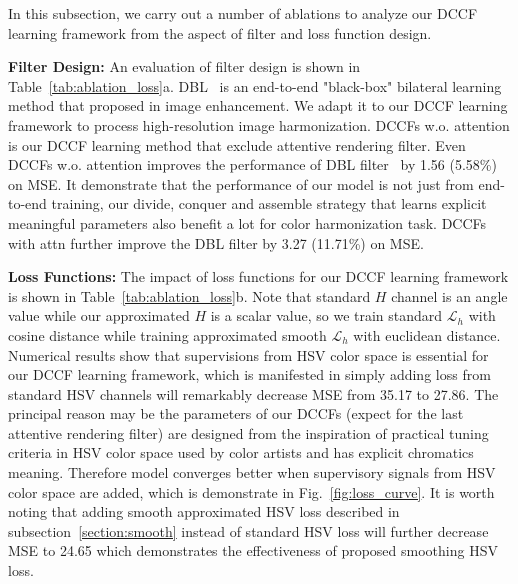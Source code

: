 \documentclass[runningheads]{llncs}
\begin{document}
    In this subsection, we carry out a number of ablations to analyze our DCCF learning framework from the aspect of filter and loss function design.
    
    \textbf{Filter Design:} An evaluation of filter design is shown in Table~\ref{tab:ablation_loss}a.
    DBL~\cite{gharbi2017deep} is an end-to-end "black-box" bilateral learning method that proposed in image enhancement.
    We adapt it to our DCCF learning framework to process high-resolution image harmonization.
    DCCFs w.o. attention is our DCCF learning method that exclude attentive rendering filter.
    Even DCCFs w.o. attention improves the performance of DBL filter~\cite{gharbi2017deep} by 1.56 (5.58\%) on MSE.
    It demonstrate that the performance of our model is not just from end-to-end training, 
    our divide, conquer and assemble strategy that learns explicit meaningful parameters also benefit a lot for color harmonization task.
    DCCFs with attn further improve the DBL filter\cite{gharbi2017deep} by 3.27 (11.71\%) on MSE.
    
    \textbf{Loss Functions:} The impact of loss functions for our DCCF learning framework is shown in Table~\ref{tab:ablation_loss}b.
Note that standard $H$ channel is an angle value while our approximated $H$ is a scalar value, so we train standard $\mathcal{L}_{h}$ with cosine distance while training approximated smooth $\mathcal{L}_{h}$ with euclidean distance.
    Numerical results show that supervisions from HSV color space is essential for our DCCF learning framework, which is manifested in simply adding loss from standard HSV channels will remarkably decrease MSE from 35.17 to 27.86.
The principal reason may be the parameters of our DCCFs (expect for the last attentive rendering filter) are designed from the inspiration of practical tuning criteria in HSV color space used by color artists and has explicit chromatics meaning.
    Therefore model converges better when supervisory signals from HSV color space are added, which is demonstrate in Fig.~\ref{fig:loss_curve}.
    It is worth noting that adding smooth approximated HSV loss described in subsection~\ref{section:smooth} instead of standard HSV loss will further decrease MSE to 24.65 which demonstrates the effectiveness of proposed smoothing HSV loss.
\end{document}

